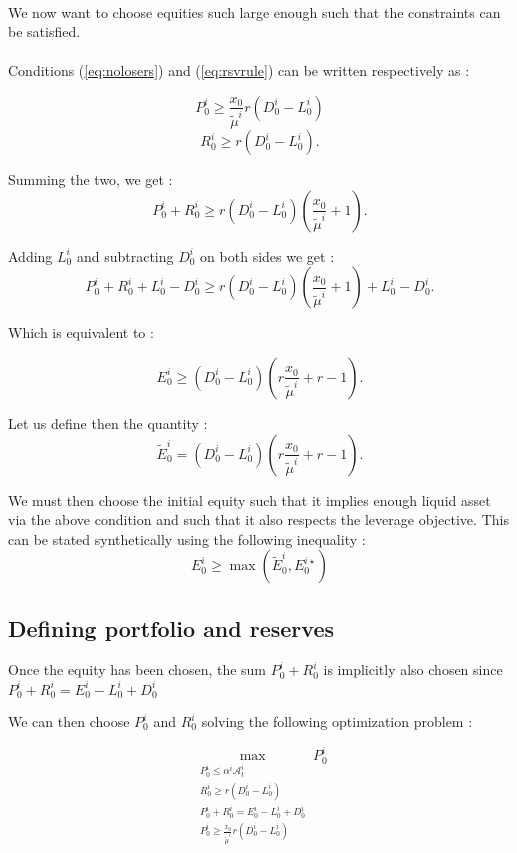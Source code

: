 \documentclass{article}
\begin{document}
\begin{appendices}
\paragraph{}
We now want to choose equities such large enough such that the constraints can be satisfied. 

\paragraph{}
Conditions (\ref{eq:nolosers}) and (\ref{eq:rsvrule}) can be written respectively as : 

$$P_0^i \geq \frac{x_0}{\tilde{\mu}^i}r(D_0^i - L_0^i)$$
$$R_0^i \geq r(D_0^i - L_0^i).$$

Summing the two, we get : 
$$P_0^i + R_0^i  \geq r(D_0^i - L_0^i)(\frac{x_0}{\tilde{\mu}^i} + 1).$$

Adding $L_0^i$ and subtracting  $D_0^i$ on both sides we get : 
$$P_0^i + R_0^i + L_0^i - D_0^i \geq r(D_0^i - L_0^i)(\frac{x_0}{\tilde{\mu}^i} + 1) + L_0^i - D_0^i.$$

Which is equivalent to : 

$$E_0^i\geq (D_0^i - L_0^i)(r\frac{x_0}{\tilde{\mu}^i} + r - 1).$$

Let us define then the quantity :
$$\tilde{E}_0^i = (D_0^i - L_0^i)(r\frac{x_0}{\tilde{\mu}^i} + r - 1).$$

We must then choose the initial equity such that it implies enough liquid asset via the above condition and such that it also respects the leverage objective. This can be stated synthetically using the following inequality : 
$$E_0^i\geq \max (\tilde{E}_0^i, E_0^{i \star}) $$

\subsection{Defining portfolio and reserves}

Once the equity has been chosen, the sum $P_0^i + R_0^i$ is implicitly also chosen since $ P_0^i + R_0^i = E_0^i - L_0^i + D_0^i $

We can then choose $P_0^i$ and $R_0^i$ solving the following optimization problem : 

$$\max_{\substack{P_0^i \leq \alpha^i \mathcal{A}_t^i \\ R_0^i \geq r(D_0^i - L_0^i) \\ P_0^i + R_0^i = E_0^i - L_0^i + D_0^i \\ P_0^i \geq \frac{x_0}{\tilde{\mu}^i}r(D_0^i - L_0^i)}} P_0^i$$


\end{appendices}
\end{document}
